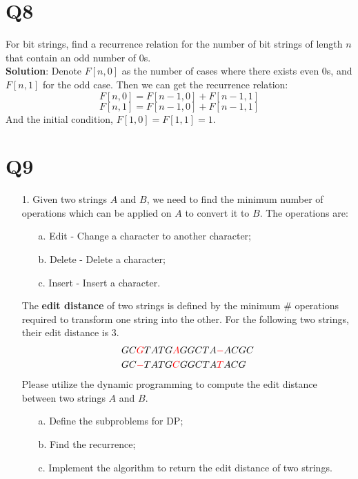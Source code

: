 \documentclass[a4paper,11pt]{article}
\newenvironment{solution}{{\\\bf Solution}:}{\smallskip}
\begin{document}
\section*{Q8}
For bit strings, find a recurrence relation for the number of bit
strings of length $n$ that contain an odd number of 0s.
\begin{solution}
    Denote $F[n,0]$ as the number of cases where there exists even 0s, and
    $F[n,1]$ for the odd case. Then we can get the recurrence relation:
    \begin{equation*}
        F[n,0]=F[n-1,0]+F[n-1,1]
    \end{equation*}
    \begin{equation*}
        F[n,1]=F[n-1,0]+F[n-1,1]
    \end{equation*}
    And the initial condition, $F[1,0]=F[1,1]=1$.
\end{solution}
\section*{Q9}
\begin{enumerate}
    \item[1.] Given two strings $A$ and $B$, we need to find the minimum number of operations which can be applied on $A$ to convert it to $B$. The operations are:
        \begin{itemize}
          \item[a.] Edit - Change a character to another character;

          \item[b.] Delete - Delete a character;

          \item[c.] Insert - Insert a character.
        \end{itemize}
        The \textbf{edit distance} of two strings is defined by the minimum \# operations required to transform one string into the other. For the following two strings, their edit distance is 3.
        \begin{align*}
          & GC\textcolor[rgb]{1.00,0.00,0.00}{G}TATG\textcolor[rgb]{1.00,0.00,0.00}{A}GGCTA\textcolor[rgb]{1.00,0.00,0.00}{-}ACGC\\
          & GC\textcolor[rgb]{1.00,0.00,0.00}{-}TATG\textcolor[rgb]{1.00,0.00,0.00}{C}GGCTA\textcolor[rgb]{1.00,0.00,0.00}{T}ACG
        \end{align*}
        Please utilize the dynamic programming to compute the edit distance between two strings $A$ and $B$.
        \begin{itemize}
          \item[a.] Define the subproblems for DP;

          \item[b.] Find the recurrence;

          \item[c.] Implement the algorithm to return the edit distance of two strings.
        \end{itemize}
 \end{enumerate}
\end{document}
